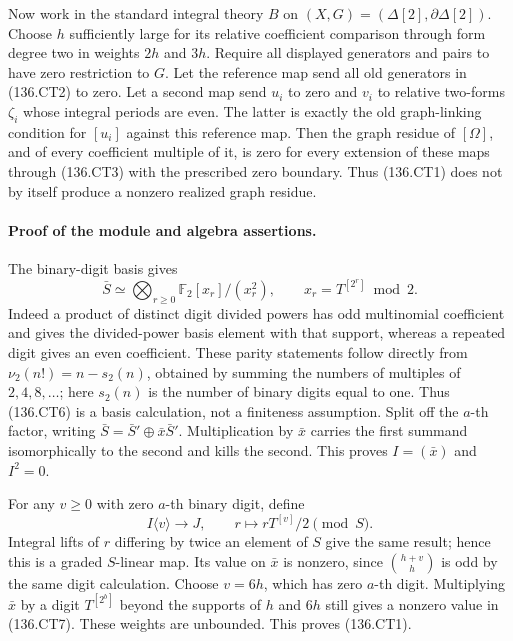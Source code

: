 Now work in the standard integral theory $B$ on
$(X,G)=(\Delta[2],\partial\Delta[2])$.  Choose $h$ sufficiently
large for its relative coefficient comparison through form
degree two in weights $2h$ and $3h$.  Require all displayed
generators and pairs to have zero restriction to $G$.
Let the reference map send all old generators in (136.CT2)
to zero.  Let a second map send $u_i$ to zero and $v_i$ to
relative two-forms $\zeta_i$ whose integral periods are even.
The latter is exactly the old graph-linking condition for
$[u_i]$ against this reference map.  Then the graph residue
of $[\Omega]$, and of every coefficient multiple of it, is
zero for every extension of these maps through (136.CT3)
with the prescribed zero boundary.  Thus (136.CT1) does not
by itself produce a nonzero realized graph residue.

\paragraph{Proof of the module and algebra assertions.}
The binary-digit basis gives
\[
       \bar S\simeq
          \bigotimes_{r\ge0}\mathbb F_2[x_r]/(x_r^2),
                    \qquad x_r=T^{[2^r]}\bmod2.
 \tag{136.CT6}
\]
Indeed a product of distinct digit divided powers has odd
multinomial coefficient and gives the divided-power basis
element with that support, whereas a repeated digit gives an
even coefficient.  These parity statements follow directly
from $\nu_2(n!)=n-s_2(n)$, obtained by summing the numbers
of multiples of $2,4,8,\ldots$; here $s_2(n)$ is the number
of binary digits equal to one.  Thus (136.CT6) is a basis
calculation, not a finiteness assumption.
Split off the $a$-th factor, writing
$\bar S=\bar S'\oplus\bar x\bar S'$.
Multiplication by $\bar x$ carries the first summand
isomorphically to the second and kills the second.  This
proves $I=(\bar x)$ and $I^2=0$.

For any $v\ge0$ with zero $a$-th binary digit, define
\[
 I\langle v\rangle\longrightarrow J,
                  \qquad r\longmapsto rT^{[v]}/2\pmod S.
 \tag{136.CT7}
\]
Integral lifts of $r$ differing by twice an element of $S$
give the same result; hence this is a graded $S$-linear map.
Its value on $\bar x$ is nonzero, since
$\binom{h+v}{h}$ is odd by the same digit calculation.
Choose $v=6h$, which has zero $a$-th digit.  Multiplying
$\bar x$ by a digit $T^{[2^b]}$ beyond the supports of $h$
and $6h$ still gives a nonzero value in (136.CT7).  These
weights are unbounded.  This proves (136.CT1).

